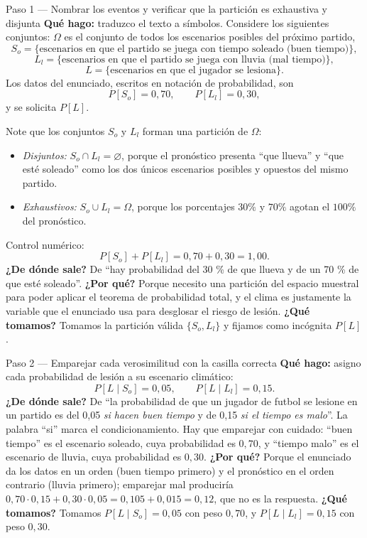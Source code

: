 \documentclass[11pt]{article}
\begin{document}
\begin{sol}

\begin{paso}{Paso 1 --- Nombrar los eventos y verificar que la partici\'on es exhaustiva y disjunta}
\textbf{Qu\'e hago:} traduzco el texto a s\'imbolos. Considere los siguientes conjuntos: $\Omega$ es el conjunto de todos los escenarios posibles del pr\'oximo partido,
\[
S_{o}=\{\text{escenarios en que el partido se juega con tiempo soleado (buen tiempo)}\},
\]
\[
L_{l}=\{\text{escenarios en que el partido se juega con lluvia (mal tiempo)}\},
\]
\[
L=\{\text{escenarios en que el jugador se lesiona}\}.
\]
Los datos del enunciado, escritos en notaci\'on de probabilidad, son
\[
P[S_{o}]=0{,}70,\qquad P[L_{l}]=0{,}30 ,
\]
y se solicita $P[L]$.

\medskip
Note que los conjuntos $S_{o}$ y $L_{l}$ forman una partici\'on de $\Omega$:
\begin{itemize}[leftmargin=1.4em]
\item \emph{Disjuntos:} $S_{o}\cap L_{l}=\varnothing$, porque el pron\'ostico presenta ``que llueva'' y ``que est\'e soleado'' como los dos \'unicos escenarios posibles y opuestos del mismo partido.
\item \emph{Exhaustivos:} $S_{o}\cup L_{l}=\Omega$, porque los porcentajes $30\%$ y $70\%$ agotan el $100\%$ del pron\'ostico.
\end{itemize}
Control num\'erico:
\[
P[S_{o}]+P[L_{l}]=0{,}70+0{,}30=1{,}00 .
\]
\textbf{¿De d\'onde sale?} De ``hay probabilidad del 30 \% de que llueva y de un 70 \% de que est\'e soleado''.
\textbf{¿Por qu\'e?} Porque necesito una partici\'on del espacio muestral para poder aplicar el teorema de probabilidad total, y el clima es justamente la variable que el enunciado usa para desglosar el riesgo de lesi\'on.
\textbf{¿Qu\'e tomamos?} Tomamos la partici\'on v\'alida $\{S_{o},L_{l}\}$ y fijamos como inc\'ognita $P[L]$.
\end{paso}

\begin{paso}{Paso 2 --- Emparejar cada verosimilitud con la casilla correcta}
\textbf{Qu\'e hago:} asigno cada probabilidad de lesi\'on a su escenario clim\'atico:
\[
P[L\mid S_{o}]=0{,}05,\qquad P[L\mid L_{l}]=0{,}15 .
\]
\textbf{¿De d\'onde sale?} De ``la probabilidad de que un jugador de futbol se lesione en un partido es del 0,05 \emph{si hacen buen tiempo} y de 0,15 \emph{si el tiempo es malo}''. La palabra ``si'' marca el condicionamiento. Hay que emparejar con cuidado: ``buen tiempo'' es el escenario soleado, cuya probabilidad es $0{,}70$, y ``tiempo malo'' es el escenario de lluvia, cuya probabilidad es $0{,}30$.
\textbf{¿Por qu\'e?} Porque el enunciado da los datos en un orden (buen tiempo primero) y el pron\'ostico en el orden contrario (lluvia primero); emparejar mal producir\'ia $0{,}70\cdot 0{,}15+0{,}30\cdot 0{,}05=0{,}105+0{,}015=0{,}12$, que no es la respuesta.
\textbf{¿Qu\'e tomamos?} Tomamos $P[L\mid S_{o}]=0{,}05$ con peso $0{,}70$, y $P[L\mid L_{l}]=0{,}15$ con peso $0{,}30$.
\end{paso}


\end{sol}
\end{document}

